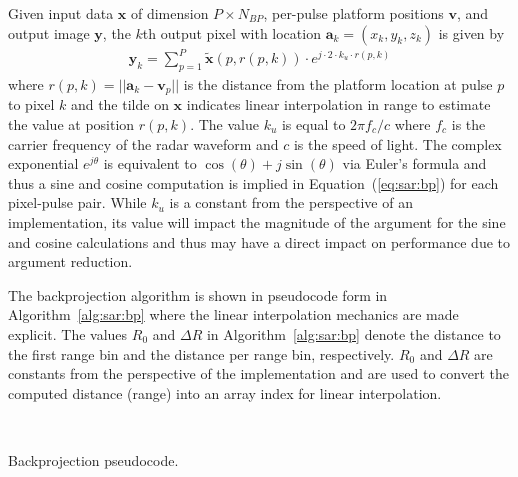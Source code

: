 \documentclass{report}
\begin{document}
Given input data $\mathbf{x}$ of dimension $P \times N_{BP}$, per-pulse platform
positions $\mathbf{v}$, and output image $\mathbf{y}$, the $k$th output pixel
with location $\mathbf{a}_k = (x_k,y_k,z_k)$ is given by
\begin{align}
    \mathbf{y}_k = \sum_{p=1}^{P} \tilde{\mathbf{x}}(p, r(p,k)) \cdot e^{j \cdot 2 \cdot k_u \cdot r(p,k)}
    \label{eq:sar:bp}
\end{align}
where $r(p,k)=||\mathbf{a}_k-\mathbf{v}_p||$ is the distance from the platform location at pulse $p$ to
pixel $k$ and the tilde on $\mathbf{x}$ indicates linear interpolation in
range to estimate the value at position $r(p,k)$.
The value $k_u$ is equal to $2\pi f_c /c$ where $f_c$ is the carrier frequency
of the radar waveform and $c$ is the speed of light.
The complex exponential $e^{j \theta}$ is equivalent to $\cos(\theta) + j \sin(\theta)$
via Euler's formula and thus a sine and cosine computation is implied
in Equation~(\ref{eq:sar:bp}) for each pixel-pulse pair.
While $k_u$ is a constant from the perspective of an implementation, its
value will impact the magnitude of the argument for the sine and cosine
calculations and thus may have a direct impact on performance due to
argument reduction.

The backprojection algorithm is shown in pseudocode form in Algorithm~\ref{alg:sar:bp}
where the linear interpolation mechanics are made explicit.
The values $R_0$ and $\Delta R$ in Algorithm~\ref{alg:sar:bp} denote
the distance to the first range bin and the distance per range bin, respectively.
$R_0$ and $\Delta R$ are constants from the perspective of the implementation and are
used to convert the computed distance (range) into an array index for linear
interpolation.

\begin{algorithm}
    \begin{algorithmic}[1]
                 
                 
                    \\ 
                \ENDIF
            \ENDFOR
        \ENDFOR
    \end{algorithmic}
    \caption{Backprojection pseudocode.}
    \label{alg:sar:bp}
\end{algorithm}
\end{document}
